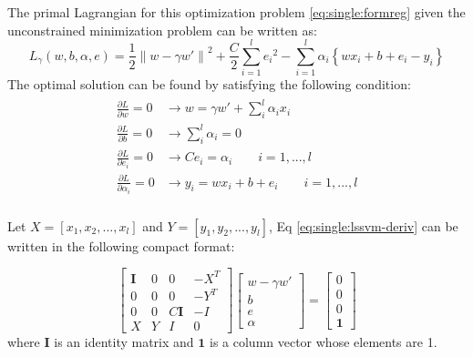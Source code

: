 The primal Lagrangian for this optimization problem \ref{eq:single:formreg} given the unconstrained minimization problem can be written as: 
\begin{equation}
	{L_\gamma }\left( {w,b,\alpha ,e} \right) = \frac{1}{2}{\left\| {w - \gamma w'} \right\|^2} + \frac{C}{2}\sum\limits_{i = 1}^l {{e _i}^2}  - \sum\limits_{i = 1}^l {{\alpha _i}\left\{ {w{x_i} + b + {e_i} - {y_i}} \right\}} 
\end{equation}
The optimal solution can be found by satisfying the following condition:
\begin{eqnarray}\label{eq:single:lssvm-deriv}
\begin{aligned}
\frac{{\partial L}}{{\partial w}} = 0 &\to w = \gamma w' + \sum\limits_i^l {{\alpha _i}{x_i}} \\
\frac{{\partial L}}{{\partial b}} = 0 &\to \sum\limits_i^l {{\alpha _i} = 0} \\
\frac{{\partial L}}{{\partial e_i}} = 0 &\to C{e_i} = {\alpha _i} \qquad i = 1,...,l\\
\frac{{\partial L}}{{\partial {\alpha _i}}} = 0 &\to {y_i} = {w} {{x_i}} + b + {e _i}\qquad i = 1,...,l\\
\end{aligned}
\end{eqnarray}

Let $X=\left[x_1,x_2,...,x_l\right]$ and $Y=[y_1,y_2,...,y_l]$, Eq \eqref{eq:single:lssvm-deriv} can be written in the following compact format:

\begin{equation}\label{eq:single:matrixsolve}
	\left[\begin{array}{cccc}
	\mathbf{I}&0&0&-X^T\\
	0&0&0&-Y^T\\
	0&0&C\mathbf{I}&-I\\
	X&Y&I&0
	\end{array}\right]
	\left[\begin{array}{c}w-\gamma w'\\b\\e\\\alpha
	\end{array}\right]	= \left[\begin{array}{c}0\\0\\0\\\mathbf{1}
	\end{array}\right]
\end{equation} 
where $\mathbf{I}$ is an identity matrix and $\mathbf{1}$ is a column  vector whose elements are 1. 

